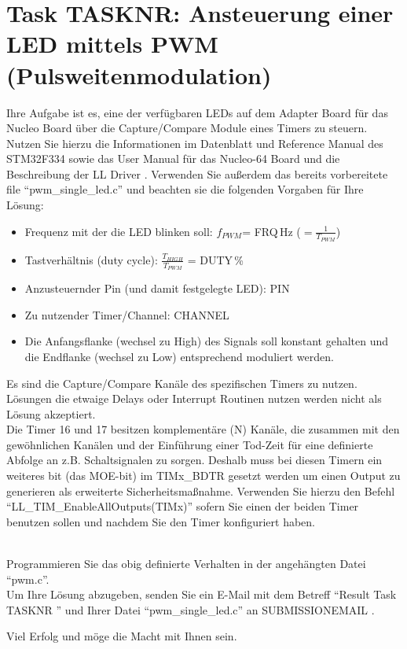 \documentclass[a4paper,12pt]{article}
\begin{document}
\pagestyle{empty}
\setlength{\parindent}{0em}
\section*{Task {{TASKNR}}: Ansteuerung einer LED mittels PWM (Pulsweitenmodulation)}

Ihre Aufgabe ist es, eine der verfügbaren LEDs auf dem Adapter Board für das Nucleo Board über die Capture/Compare Module eines Timers zu steuern. Nutzen Sie hierzu die Informationen im Datenblatt \cite{data_sheet} und Reference Manual \cite{ref_manual} des STM32F334 sowie das User Manual für das Nucleo-64 Board \cite{nucleo_manual} und die Beschreibung der LL Driver \cite{driver_manual}. Verwenden Sie außerdem das bereits vorbereitete file \enquote{pwm\_single\_led.c} und beachten sie die folgenden Vorgaben für Ihre Lösung:

\begin{itemize}
\item Frequenz mit der die LED blinken soll: $f_{PWM}$= {{FRQ}}\,Hz ($=\frac{1}{T_{PWM}}$)
\item Tastverh\"altnis (duty cycle):  $\frac{T_{HIGH}}{T_{PWM}}$ = {{DUTY}}\,\%
\item Anzusteuernder Pin (und damit festgelegte LED): {{PIN}}
\item Zu nutzender Timer/Channel: {{CHANNEL}}
\item Die Anfangsflanke (wechsel zu High) des Signals soll konstant gehalten und die Endflanke (wechsel zu Low) entsprechend moduliert werden.
\end{itemize}
\vspace{0.3cm}

Es sind die Capture/Compare Kanäle des spezifischen Timers zu nutzen. Lösungen die etwaige Delays oder Interrupt Routinen nutzen werden nicht als Lösung akzeptiert.
\\


Die Timer 16 und 17 besitzen komplementäre (N) Kanäle, die zusammen mit den gewöhnlichen Kanälen und der Einführung einer Tod-Zeit für eine definierte Abfolge an z.B. Schaltsignalen zu sorgen. Deshalb muss bei diesen Timern ein weiteres bit (das MOE-bit) im TIMx\_BDTR gesetzt werden um einen Output zu generieren als erweiterte Sicherheitsmaßnahme. Verwenden Sie hierzu den Befehl \enquote{LL\_TIM\_EnableAllOutputs(TIMx)} sofern Sie einen der beiden Timer benutzen sollen und nachdem Sie den Timer konfiguriert haben.

\\

Programmieren Sie das obig definierte Verhalten in der angeh\"angten Datei \enquote{pwm.c}.
\\

Um Ihre L\"osung abzugeben, senden Sie ein E-Mail mit dem Betreff \enquote{Result Task {{ TASKNR }}} und Ihrer Datei \enquote{pwm\_single\_led.c}  an {{ SUBMISSIONEMAIL }}.

\vspace{0.7cm}

Viel Erfolg und m\"oge die Macht mit Ihnen sein.

\printbibliography[heading=bibintoc]
\end{document}
